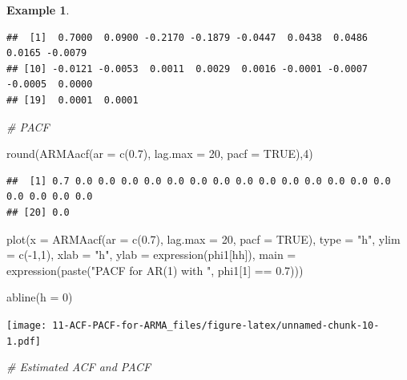 \documentclass[
]{book}
\newenvironment{Shaded}{\begin{snugshade}}{\end{snugshade}}
\newcommand{\AttributeTok}[1]{\textcolor[rgb]{0.77,0.63,0.00}{#1}}
\newcommand{\CommentTok}[1]{\textcolor[rgb]{0.56,0.35,0.01}{\textit{#1}}}
\newcommand{\ConstantTok}[1]{\textcolor[rgb]{0.00,0.00,0.00}{#1}}
\newcommand{\DecValTok}[1]{\textcolor[rgb]{0.00,0.00,0.81}{#1}}
\newcommand{\FloatTok}[1]{\textcolor[rgb]{0.00,0.00,0.81}{#1}}
\newcommand{\FunctionTok}[1]{\textcolor[rgb]{0.00,0.00,0.00}{#1}}
\newcommand{\NormalTok}[1]{#1}
\newcommand{\SpecialCharTok}[1]{\textcolor[rgb]{0.00,0.00,0.00}{#1}}
\newcommand{\StringTok}[1]{\textcolor[rgb]{0.31,0.60,0.02}{#1}}
\theoremstyle{definition}
\theoremstyle{definition}
\newtheorem{example}{Example}[chapter]
\theoremstyle{definition}
\theoremstyle{definition}
\theoremstyle{remark}
\begin{document}
\begin{example}
\begin{verbatim}
##  [1]  0.7000  0.0900 -0.2170 -0.1879 -0.0447  0.0438  0.0486  0.0165 -0.0079
## [10] -0.0121 -0.0053  0.0011  0.0029  0.0016 -0.0001 -0.0007 -0.0005  0.0000
## [19]  0.0001  0.0001
\end{verbatim}

\begin{Shaded}
\begin{Highlighting}[]
\CommentTok{\# PACF}

\FunctionTok{round}\NormalTok{(}\FunctionTok{ARMAacf}\NormalTok{(}\AttributeTok{ar =} \FunctionTok{c}\NormalTok{(}\FloatTok{0.7}\NormalTok{), }\AttributeTok{lag.max =} \DecValTok{20}\NormalTok{, }\AttributeTok{pacf =} \ConstantTok{TRUE}\NormalTok{),}\DecValTok{4}\NormalTok{)}
\end{Highlighting}
\end{Shaded}

\begin{verbatim}
##  [1] 0.7 0.0 0.0 0.0 0.0 0.0 0.0 0.0 0.0 0.0 0.0 0.0 0.0 0.0 0.0 0.0 0.0 0.0 0.0
## [20] 0.0
\end{verbatim}

\begin{Shaded}
\begin{Highlighting}[]
\FunctionTok{plot}\NormalTok{(}\AttributeTok{x =} \FunctionTok{ARMAacf}\NormalTok{(}\AttributeTok{ar =} \FunctionTok{c}\NormalTok{(}\FloatTok{0.7}\NormalTok{), }\AttributeTok{lag.max =} \DecValTok{20}\NormalTok{, }\AttributeTok{pacf =} \ConstantTok{TRUE}\NormalTok{), }\AttributeTok{type =} \StringTok{"h"}\NormalTok{, }\AttributeTok{ylim =} \FunctionTok{c}\NormalTok{(}\SpecialCharTok{{-}}\DecValTok{1}\NormalTok{,}\DecValTok{1}\NormalTok{), }\AttributeTok{xlab =} \StringTok{"h"}\NormalTok{, }\AttributeTok{ylab =} \FunctionTok{expression}\NormalTok{(phi1[hh]),}
       \AttributeTok{main =} \FunctionTok{expression}\NormalTok{(}\FunctionTok{paste}\NormalTok{(}\StringTok{"PACF for AR(1) with "}\NormalTok{, phi1[}\DecValTok{1}\NormalTok{] }\SpecialCharTok{==} \FloatTok{0.7}\NormalTok{)))}
  
\FunctionTok{abline}\NormalTok{(}\AttributeTok{h =} \DecValTok{0}\NormalTok{)}
\end{Highlighting}
\end{Shaded}

\texttt{[image: 11-ACF-PACF-for-ARMA\_files/figure-latex/unnamed-chunk-10-1.pdf]}

\begin{Shaded}
\begin{Highlighting}[]
\CommentTok{\# Estimated ACF and PACF}


\end{Highlighting}
\end{Shaded}
\end{example}
\end{document}
